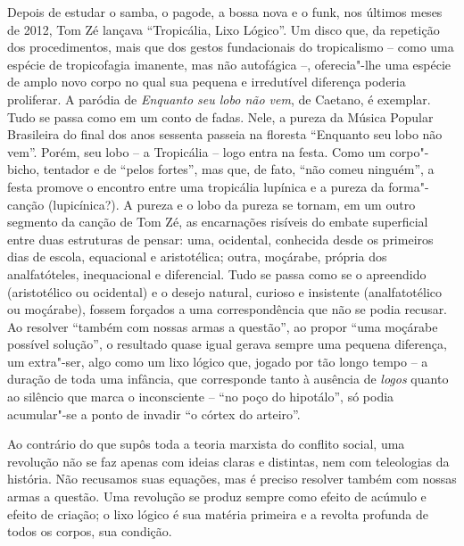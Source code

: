 Depois de estudar o samba, o pagode, a bossa nova
e o funk, nos últimos meses de 2012, Tom Zé lançava ``Tropicália, Lixo
Lógico''. Um disco que, da repetição dos procedimentos, mais que dos
gestos fundacionais do tropicalismo -- como uma espécie de tropicofagia
imanente, mas não autofágica --, oferecia"-lhe uma espécie de amplo novo
corpo no qual sua pequena e irredutível diferença poderia proliferar. A
paródia de \emph{Enquanto seu lobo não vem}, de Caetano, é exemplar.
Tudo se passa como em um conto de fadas. Nele, a pureza da Música
Popular Brasileira do final dos anos sessenta passeia na floresta
``Enquanto seu lobo não vem''. Porém, seu lobo -- a Tropicália -- logo
entra na festa. Como um corpo"-bicho, tentador e de ``pelos fortes'', mas
que, de fato, ``não comeu ninguém'', a festa promove o encontro entre
uma tropicália lupínica e a pureza da forma"-canção (lupicínica?). A
pureza e o lobo da pureza se tornam, em um outro segmento da canção de
Tom Zé, as encarnações risíveis do embate superficial entre duas
estruturas de pensar: uma, ocidental, conhecida desde os primeiros dias
de escola, equacional e aristotélica; outra, moçárabe, própria dos
analfatóteles, inequacional e diferencial. Tudo se passa como se o
apreendido (aristotélico ou ocidental) e o desejo natural, curioso e
insistente (analfatotélico ou moçárabe), fossem forçados a uma
correspondência que não se podia recusar. Ao resolver ``também com
nossas armas a questão'', ao propor ``uma moçárabe possível solução'', o
resultado quase igual gerava sempre uma pequena diferença, um extra"-ser,
algo como um lixo lógico que, jogado por tão longo tempo -- a duração de
toda uma infância, que corresponde tanto à ausência de \emph{logos}
quanto ao silêncio que marca o inconsciente -- ``no poço do hipotálo'',
só podia acumular"-se a ponto de invadir ``o córtex do arteiro''.

Ao contrário do que supôs toda a teoria marxista do conflito social, uma
revolução não se faz apenas com ideias claras e distintas, nem com
teleologias da história. Não recusamos suas equações, mas é preciso
resolver também com nossas armas a questão. Uma revolução se produz
sempre como efeito de acúmulo e efeito de criação; o lixo lógico é sua
matéria primeira e a revolta profunda de todos os corpos, sua condição.

